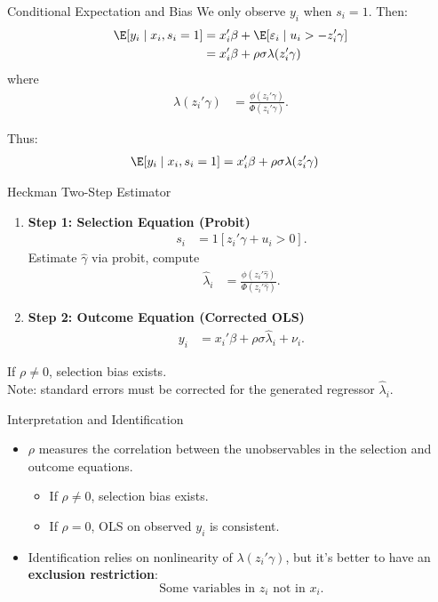 \documentclass[aspectratio=169,11pt]{beamer}
\begin{document}
\begin{frame}{Conditional Expectation and Bias}
We only observe $y_i$ when $s_i = 1$. Then:
\begin{align*}
\E[y_i \mid x_i, s_i=1]
    &= x_i'\beta + \E[\varepsilon_i \mid u_i > -z_i'\gamma] \\
    &= x_i'\beta + \rho \sigma \lambda(z_i'\gamma)
\end{align*}
where
\begin{align*}
\lambda(z_i'\gamma)
    &= \frac{\phi(z_i'\gamma)}{\Phi(z_i'\gamma)}.
\end{align*}

Thus:
\begin{align*}
\E[y_i \mid x_i, s_i=1]
    &= x_i'\beta + \rho\sigma \lambda(z_i'\gamma)
\end{align*}
\end{frame}

\begin{frame}{Heckman Two-Step Estimator}
\begin{enumerate}
    \item \textbf{Step 1: Selection Equation (Probit)}
    \begin{align*}
    s_i &= 1[z_i'\gamma + u_i > 0].
    \end{align*}
    Estimate $\hat{\gamma}$ via probit, compute
    \begin{align*}
    \hat{\lambda}_i &= \frac{\phi(z_i'\hat{\gamma})}{\Phi(z_i'\hat{\gamma})}.
    \end{align*}
    \item \textbf{Step 2: Outcome Equation (Corrected OLS)}
    \begin{align*}
    y_i &= x_i'\beta + \rho\sigma \hat{\lambda}_i + \nu_i.
    \end{align*}
\end{enumerate}

If $\rho \neq 0$, selection bias exists.\\
\vspace{0.2cm}
Note: standard errors must be corrected for the generated regressor $\hat{\lambda}_i$.
\end{frame}


\begin{frame}{Interpretation and Identification}
\begin{itemize}
    \item $\rho$ measures the correlation between the unobservables in the selection and outcome equations.
    \begin{itemize}
        \item If $\rho \neq 0$, selection bias exists.
        \item If $\rho = 0$, OLS on observed $y_i$ is consistent.
    \end{itemize}
    \item Identification relies on nonlinearity of $\lambda(z_i'\gamma)$, but it’s better to have an \textbf{exclusion restriction}:
    \[
    \text{Some variables in } z_i \text{ not in } x_i.
    \]
\end{itemize}
\end{frame}
\end{document}

